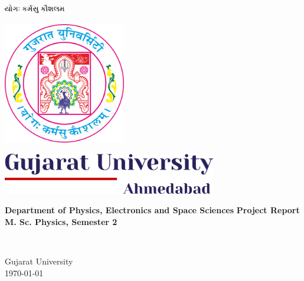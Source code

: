 \documentclass[17pt,a4paper]{extarticle}%
\begin{document}
\begin{titlepage}
\centering
  
\begin{center}
    \includegraphics[width=0.2\textwidth]{yogam.png}
\end{center}
\vspace{0.5cm}
\begin{center}
    \includegraphics[width=0.4\textwidth]{logo_em.png}
\end{center}

\vfill

\begin{center}
    \includegraphics[width=0.7\textwidth]{gujuni.png}
\end{center}
\vspace{1cm}
\begin{large}
\textbf{Department of Physics,
Electronics and Space Sciences}
\vfill
\textbf{Project Report}\\
\textbf{M. Sc. Physics, Semester 2}
\end{large}\\[10pt]
\vfill



\vfill

Gujarat University\\[2.5pt]
\today

\end{titlepage}





  
  
\end{document}

